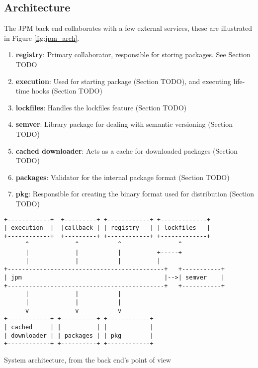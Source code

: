 \subsection{Architecture}

The JPM back end collaborates with a few external services, these are
illustrated in Figure \ref{fig:jpm_arch}.

\begin{enumerate}

\item \textbf{registry}: Primary collaborator, responsible for storing
packages. See Section TODO

\item \textbf{execution}: Used for starting package (Section TODO), and
executing life-time hooks (Section TODO)

\item \textbf{lockfiles}: Handles the lockfiles feature (Section TODO)

\item \textbf{semver}: Library package for dealing with semantic versioning
(Section TODO)

\item \textbf{cached downloader}: Acts as a cache for downloaded packages
(Section TODO)

\item \textbf{packages}: Validator for the internal package format (Section
TODO)

\item \textbf{pkg}: Responsible for creating the binary format used for
distribution (Section TODO)

\end{enumerate}


\begin{listing}[H]
\begin{verbatim}
+------------+  +---------+ +------------+ +-------------+
| execution  |  |callback | | registry   | | lockfiles   |
+------------+  +---------+ +------------+ +-------------+
      ^             ^           ^                ^
      |             |           |          +-----+
      |             |           |          |
+--------------------------------------------+   +-----------+
| jpm                                        |-->| semver    |
+--------------------------------------------+   +-----------+
      |             |           |
      |             |           |
      v             v           v
+------------+ +----------+ +------------+
| cached     | |          | |            |
| downloader | | packages | | pkg        |
+------------+ +----------+ +------------+
\end{verbatim}
\caption{System architecture, from the back end's point of view}
\label{fig:jpm_arch}
\end{listing}


